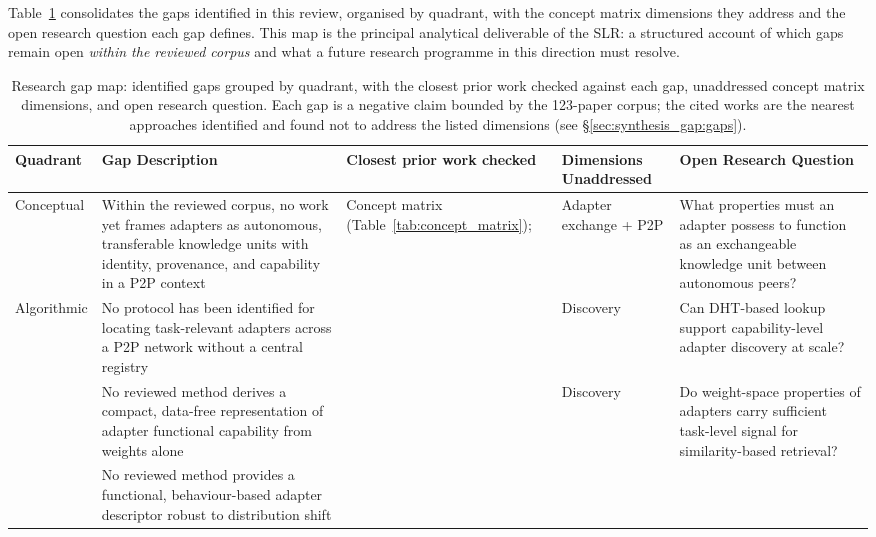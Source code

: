 Table~\ref{tab:gap_map} consolidates the gaps identified in this review,
organised by quadrant, with the concept matrix dimensions they address
and the open research question each gap defines. This map is the principal
analytical deliverable of the SLR: a structured account of which gaps remain
open \emph{within the reviewed corpus} and what a future research programme
in this direction must resolve.

\begin{table}[H]
\centering
\caption{Research gap map: identified gaps grouped by quadrant, with the closest
         prior work checked against each gap, unaddressed concept matrix
         dimensions, and open research question. Each gap is a negative claim
         bounded by the 123-paper corpus; the cited works are the nearest
         approaches identified and found not to address the listed dimensions
         (see \S\ref{sec:synthesis_gap:gaps}).}
\label{tab:gap_map}
\setlength{\tabcolsep}{4pt}
\footnotesize
\begin{tabular}{p{1.9cm}p{3.3cm}p{2cm}p{1.9cm}p{3.9cm}}
\toprule
\textbf{Quadrant} &
\textbf{Gap Description} &
\textbf{Closest prior work checked} &
\textbf{Dimensions Unaddressed} &
\textbf{Open Research Question} \\
\midrule
Conceptual &
  Within the reviewed corpus, no work yet frames adapters as autonomous,
  transferable knowledge units with identity, provenance, and capability in a
  P2P context &
  Concept matrix (Table~\ref{tab:concept_matrix}); \cite{Sajina2024,Ponti2023} &
  Adapter exchange + P2P &
  What properties must an adapter possess to function as an exchangeable
  knowledge unit between autonomous peers? \\
\midrule
\multirow{3}{*}{Algorithmic} &
  No protocol has been identified for locating task-relevant adapters across a P2P network
  without a central registry &
  \cite{MaymounkovKademlia2002,ZhaoLoraRetriever2024,Ostapenko2024} &
  Discovery &
  Can DHT-based lookup support capability-level adapter discovery at scale? \\[4pt]
  &
  No reviewed method derives a compact, data-free representation of adapter functional
  capability from weights alone &
  \cite{Ostapenko2024,Muqeeth2024} &
  Discovery &
  Do weight-space properties of adapters carry sufficient task-level signal
  for similarity-based retrieval? \\[4pt]
  &
  No reviewed method provides a functional, behaviour-based adapter descriptor robust
  to distribution shift &
  \cite{ZhaoLoraRetriever2024,Muqeeth2024} &

\end{tabular}
\end{table}
